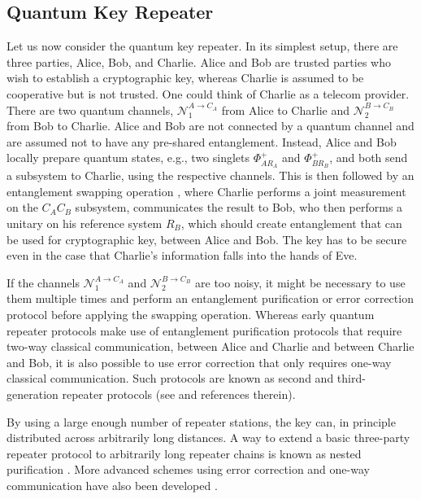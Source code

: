 \documentclass[aps,pra,twocolumn,superscriptaddress,longbibliography]{revtex4-1}
\newcommand{\mc}[1]{\mathcal{#1}}
\begin{document}
\subsection{Quantum Key Repeater}

Let us now consider the quantum key repeater. In its simplest setup, there are three parties, Alice, Bob, and Charlie. Alice and Bob are trusted parties who wish to establish a cryptographic key, whereas Charlie is assumed to be cooperative but is not trusted. One could think of Charlie as a telecom provider. There are two quantum channels, ${\mc N}_1^{A\to C_A}$ from Alice to Charlie and ${\mc N}_2^{B\to C_B}$ from Bob to Charlie. Alice and Bob are not connected by a quantum channel and are assumed not to have any pre-shared entanglement. Instead, Alice and Bob locally prepare quantum states, e.g., two singlets $\Phi^+_{AR_A}$ and $\Phi^+_{BR_B}$, and both send a subsystem to Charlie, using the respective channels. This is then followed by an entanglement swapping operation 
\cite{PhysRevLett.71.4287}, where Charlie performs a joint measurement on the $C_AC_B$ subsystem, communicates the result to Bob, who then performs a unitary on his reference system $R_B$, which should create entanglement that can be used for cryptographic key, between Alice and Bob. The key has to be secure even in the case that Charlie's information falls into the hands of Eve.

If the channels ${\mc N}_1^{A\to C_A}$  and ${\mc N}_2^{B\to C_B}$ are too noisy, it might be necessary to use them multiple times and perform an entanglement purification or error correction protocol before applying the swapping operation. Whereas early quantum repeater protocols \cite{PhysRevLett.81.5932,PhysRevA.59.169} make use of entanglement purification protocols that require two-way classical communication, between Alice and Charlie and between Charlie and Bob, it is also possible to use error correction that only requires one-way classical communication. Such protocols are known as second and third-generation repeater protocols  (see \cite{munro2015inside} and references therein).

By using a large enough number of repeater stations, the key can, in principle distributed across arbitrarily long distances. A way to extend a basic three-party repeater protocol to arbitrarily long repeater chains is known as nested purification \cite{PhysRevA.59.169}. 
More advanced schemes using error correction and one-way communication have also been developed \cite{munro2015inside}.
\end{document}

